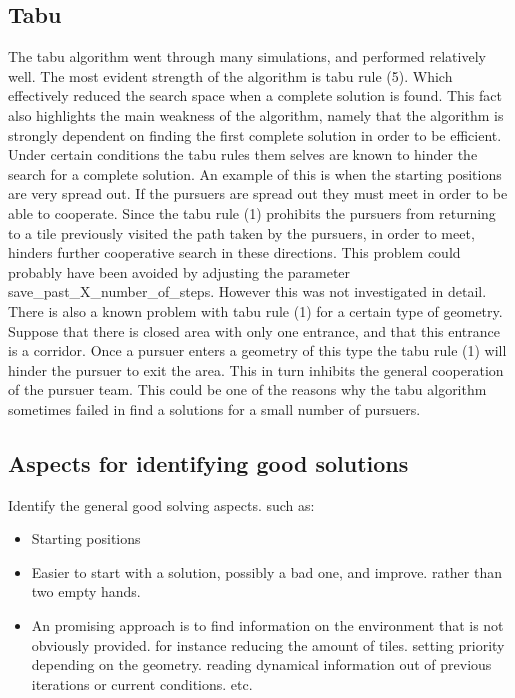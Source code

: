 \subsection{Tabu}
The tabu algorithm went through many simulations, and performed relatively well. The most evident strength of the algorithm is tabu rule (5). Which effectively reduced the search space when a complete solution is found. This fact also highlights the main weakness of the algorithm, namely that the algorithm is strongly dependent on finding the first complete solution in order to be efficient. Under certain conditions the tabu rules them selves are known to hinder the search for a complete solution. An example of this is when the starting positions are very spread out.  If the pursuers are spread out they must meet in order to be able to cooperate. Since the tabu rule (1) prohibits the pursuers from returning to a tile previously visited the path taken by the pursuers, in order to meet, hinders further cooperative search in these directions. This problem could probably have been avoided by adjusting the parameter save\_past\_X\_number\_of\_steps. However this was not investigated in detail. There is also a known problem with tabu rule (1) for a certain type of geometry. Suppose that there is closed area with only one entrance, and that this entrance is a corridor. Once a pursuer enters a geometry of this type the tabu rule (1) will hinder the pursuer to exit the area. This in turn inhibits the general cooperation of the pursuer team. This could be one of the reasons why the tabu algorithm sometimes failed in find a solutions for a small number of pursuers.

\subsection{Aspects for identifying good solutions}
Identify the general good solving aspects. such as:\\
\begin{itemize}
\item Starting positions
\item Easier to start with a solution, possibly a bad one, and improve. rather than two empty hands.
\item An promising approach is to find information on the environment that is not obviously provided. for instance reducing the amount of tiles. setting priority depending on the geometry. reading dynamical information out of previous iterations or current conditions. etc.
\end{itemize}


